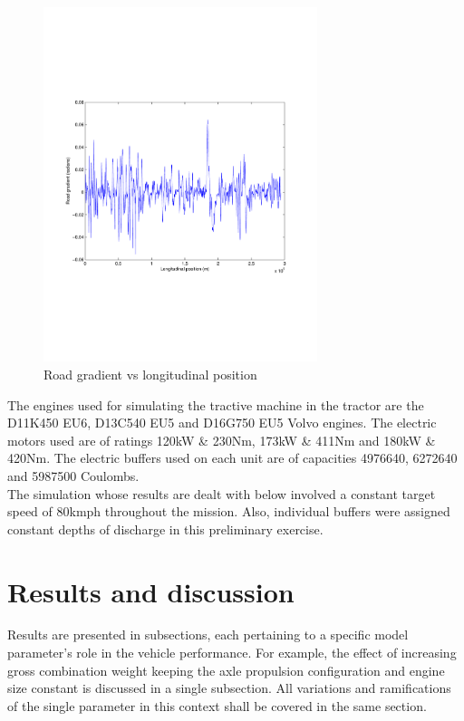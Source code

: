 \documentclass{article}
\begin{document}
\begin{figure}[h!]
\centering
\includegraphics[width=80mm, clip=true, trim=45 185 65 208]{Figures/roadGradient.pdf}
\caption{Road gradient vs longitudinal position}
\label{roadGradient}
\end{figure}

The engines used for simulating the tractive machine in the tractor are the D11K450 EU6, D13C540 EU5 and D16G750 EU5 Volvo engines. The electric motors used are of ratings 120kW \& 230Nm, 173kW \& 411Nm and  180kW \& 420Nm. The electric buffers used on each unit are of capacities 4976640, 6272640 and 5987500 Coulombs.\\

The simulation whose results are dealt with below involved a constant target speed of 80kmph throughout the mission. Also, individual buffers were assigned constant depths of discharge in this preliminary exercise.

\section{Results and discussion}
Results are presented in subsections, each pertaining to a specific model parameter's role in the vehicle performance. For example, the effect of increasing gross combination weight keeping the axle propulsion configuration and engine size constant is discussed in a single subsection. All variations and ramifications of the single parameter in this context shall be covered in the same section.
\end{document}
